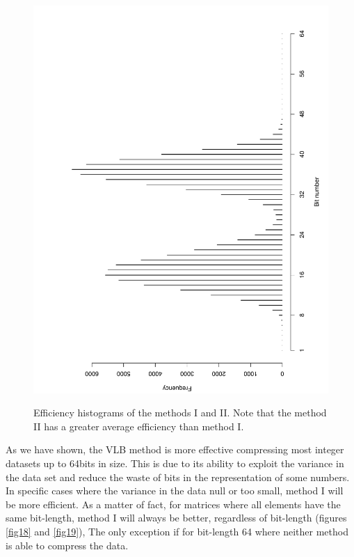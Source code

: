 \documentclass[10pt]{article}
\begin{document}
\begin{figure}[h]
{  \includegraphics[scale=0.4,angle=-90]{fig15}
  \label{fig:15}
  }
  \caption{Efficiency histograms of the methods I and II. Note that the method II has a greater average efficiency than method I.}
  \label{fig:1415}
\end{figure}


As we have shown, the VLB method is more effective compressing most integer datasets up to 64bits in size. This is due to its ability to exploit the variance in the data set and reduce the waste of bits in the representation of some numbers. In specific cases where the variance in the data null or too small, method I will be more efficient. As a matter of fact, for matrices where all elements have the same bit-length, method I will always be better, regardless of bit-length (figures \ref{fig18} and \ref{fig19}), The only exception if for bit-length 64 where neither method is able to compress the data. 
\end{document}
